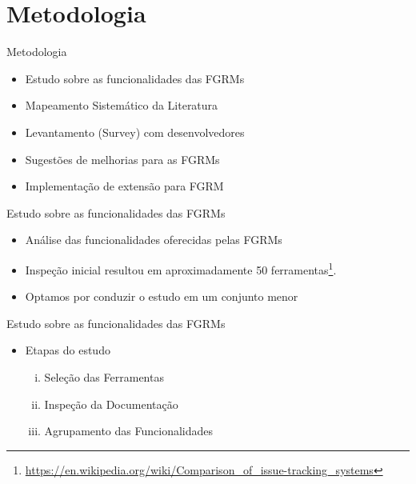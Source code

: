 \documentclass[t,14pt,mathserif]{beamer}
\begin{document}
\section{Metodologia}

\begin{frame}{Metodologia}

    \begin{itemize}
        \item Estudo sobre as funcionalidades das FGRMs
        \item Mapeamento Sistemático da Literatura~\cite{Petersen2008}
        \item Levantamento (Survey) com
              desenvolvedores~\cite{wohlin2012experimentation}
        \item Sugestões de melhorias para as FGRMs
        \item Implementação de extensão para FGRM
    \end{itemize}
\end{frame}
\begin{frame}{Estudo sobre as funcionalidades das FGRMs}

    \begin{itemize}
        \item Análise das funcionalidades oferecidas pelas FGRMs
        \item Inspeção inicial resultou em aproximadamente 50
            ferramentas\footnote{\url{https://en.wikipedia.org/wiki/Comparison_of_issue-tracking_systems}}.
        \item Optamos por conduzir o estudo em um conjunto menor
    \end{itemize}

\end{frame}

\begin{frame}{Estudo sobre as funcionalidades das FGRMs}
    \begin{itemize}
        \item Etapas do estudo
            \begin{enumerate}[(i)]
                \item Seleção das Ferramentas
                \item Inspeção da Documentação
                \item Agrupamento das Funcionalidades
            \end{enumerate}
    \end{itemize}
\end{frame}
\end{document}

